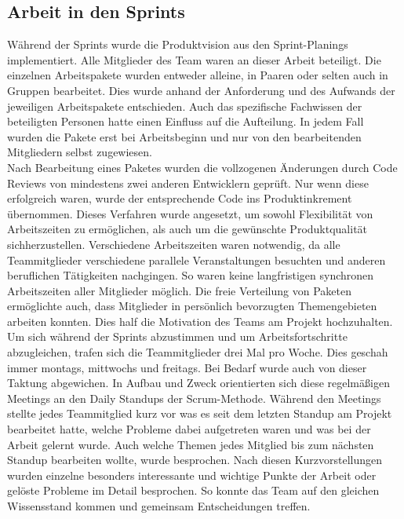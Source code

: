\documentclass[10pt, a4paper]{article}
\begin{document}
\begin{onehalfspace}
  \subsection{Arbeit in den Sprints}
  Während der Sprints wurde die Produktvision aus den Sprint-Planings implementiert.
  Alle Mitglieder des Team waren an dieser Arbeit beteiligt.
  Die einzelnen Arbeitspakete wurden entweder alleine, in Paaren oder selten auch in Gruppen bearbeitet.
  Dies wurde anhand der Anforderung und des Aufwands der jeweiligen Arbeitspakete entschieden.
  Auch das spezifische Fachwissen der beteiligten Personen hatte einen Einfluss auf die Aufteilung.
  In jedem Fall wurden die Pakete erst bei Arbeitsbeginn und nur von den bearbeitenden Mitgliedern selbst zugewiesen.
  \\
  Nach Bearbeitung eines Paketes wurden die vollzogenen Änderungen durch Code Reviews von mindestens zwei anderen Entwicklern geprüft.
  Nur wenn diese erfolgreich waren, wurde der entsprechende Code ins Produktinkrement übernommen.
  Dieses Verfahren wurde angesetzt, um sowohl Flexibilität von Arbeitszeiten zu ermöglichen, als auch um die gewünschte Produktqualität sichherzustellen.
  Verschiedene Arbeitszeiten waren notwendig, da alle Teammitglieder verschiedene parallele Veranstaltungen besuchten und anderen beruflichen Tätigkeiten nachgingen.
  So waren keine langfristigen synchronen Arbeitszeiten aller Mitglieder möglich.
  Die freie Verteilung von Paketen ermöglichte auch, dass Mitglieder in persönlich bevorzugten Themengebieten arbeiten konnten.
  Dies half die Motivation des Teams am Projekt hochzuhalten.
  \\
  Um sich während der Sprints abzustimmen und um Arbeitsfortschritte abzugleichen, trafen sich die Teammitglieder drei Mal pro Woche.
  Dies geschah immer montags, mittwochs und freitags.
  Bei Bedarf wurde auch von dieser Taktung abgewichen.
  In Aufbau und Zweck orientierten sich diese regelmäßigen Meetings an den \glqq Daily Standups\grqq{} der Scrum-Methode.
  Während den Meetings stellte jedes Teammitglied kurz vor was es seit dem letzten Standup am Projekt bearbeitet hatte, welche Probleme dabei aufgetreten waren und was bei der Arbeit gelernt wurde.
  Auch welche Themen jedes Mitglied bis zum nächsten Standup bearbeiten wollte, wurde besprochen.
  Nach diesen Kurzvorstellungen wurden einzelne besonders interessante und wichtige Punkte der Arbeit oder gelöste Probleme im Detail besprochen.
  So konnte das Team auf den gleichen Wissensstand kommen und gemeinsam Entscheidungen treffen.


\end{onehalfspace}
\end{document}

